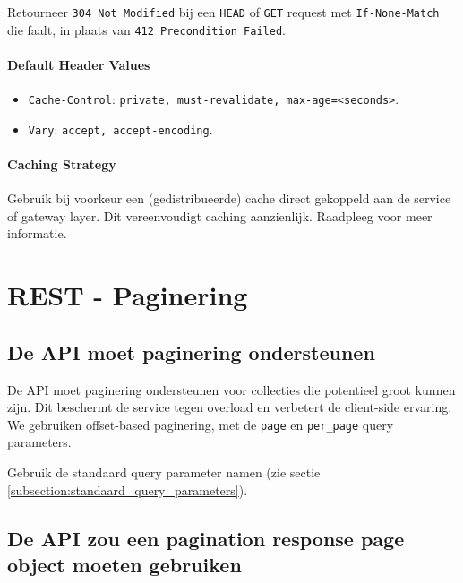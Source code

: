 Retourneer \texttt{304 Not Modified} bij een \texttt{HEAD} of \texttt{GET} request met \texttt{If-None-Match} die faalt, in plaats van \texttt{412 Precondition Failed}.


\paragraph{Default Header Values}

\begin{itemize}
    \item \texttt{Cache-Control}: \texttt{private, must-revalidate, max-age=<seconds>}.
    \item \texttt{Vary}: \texttt{accept, accept-encoding}.
\end{itemize}

\paragraph{Caching Strategy}

Gebruik bij voorkeur een (gedistribueerde) cache direct gekoppeld aan de service of gateway layer. Dit vereenvoudigt caching aanzienlijk. Raadpleeg \autocite{rfc9111} voor meer informatie.

\section{REST - Paginering}
\label{subsection:paginering}

\subsection{De API moet paginering ondersteunen}
\label{subsection:paginering_ondersteunen}

De API moet paginering ondersteunen voor collecties die potentieel groot kunnen zijn. Dit beschermt de service tegen overload en verbetert de client-side ervaring. We gebruiken offset-based paginering, met de \texttt{page} en \texttt{per\_page} query parameters.

Gebruik de standaard query parameter namen (zie sectie \ref{subsection:standaard_query_parameters}).

\subsection{De API zou een pagination response page object moeten gebruiken}
\label{subsection:paginering_response_object}

